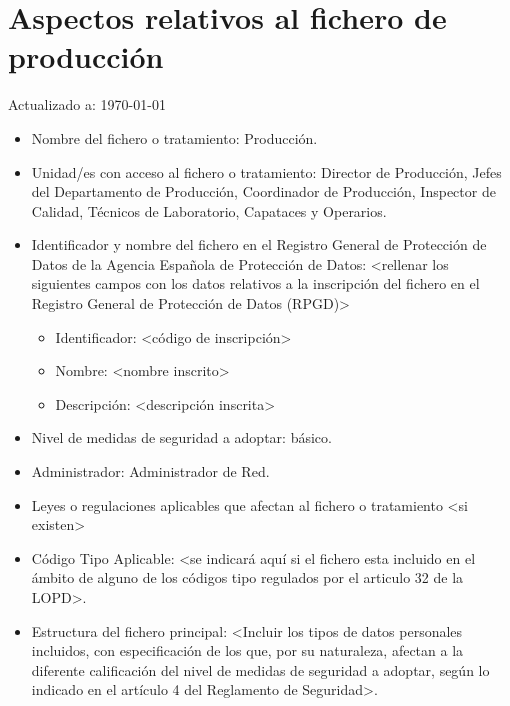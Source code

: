 \documentclass[a4paper,11pt,bibtotoc,noliststotoc]{scrbook}
\begin{document}
\section{Aspectos relativos al fichero de producción}


Actualizado a: \today

\begin{itemize}
\item Nombre del fichero o tratamiento: Producción.

\item Unidad/es con acceso al fichero o tratamiento: Director de Producción, Jefes del Departamento de Producción, Coordinador de Producción, Inspector de Calidad, Técnicos de Laboratorio, Capataces y Operarios.

\item Identificador y nombre del fichero en el Registro General de Protección de Datos de la Agencia Española de Protección de Datos: <rellenar los siguientes campos con los datos relativos a la inscripción del fichero en el Registro General de Protección de Datos (RPGD)>
	\begin{itemize}
	\item Identificador: <código de inscripción>
	\item Nombre: <nombre inscrito>
	\item Descripción: <descripción inscrita>
	\end{itemize}

\item Nivel de medidas de seguridad a adoptar: básico.

\item Administrador: Administrador de Red.

\item Leyes o regulaciones aplicables que afectan al fichero o tratamiento <si existen>

\item Código Tipo Aplicable: <se indicará aquí si el fichero esta incluido en el ámbito de alguno de los códigos tipo regulados por el articulo 32 de la LOPD>.

\item Estructura del fichero principal: <Incluir los tipos de datos personales incluidos, con especificación de los que, por su naturaleza, afectan a la diferente calificación del nivel de medidas de seguridad a adoptar, según lo indicado en el artículo 4 del Reglamento de Seguridad>.


\end{itemize}
\end{document}
